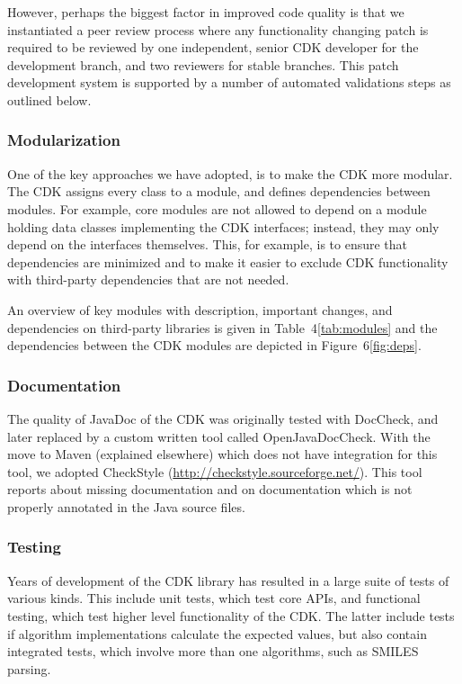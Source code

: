 \documentclass[10pt]{bmcart}
\begin{document}
However, perhaps the biggest factor in improved code quality is that we
instantiated a peer review process where any functionality changing patch is
required to be reviewed by one independent, senior CDK developer for  the development
branch, and two reviewers for stable branches. This patch development system
is supported by a number of automated validations steps as outlined below.

  \subsubsection*{Modularization}
  
One of the key approaches we have adopted, is to make the CDK more modular. The CDK assigns
every class to a module, and defines dependencies between modules. For example, core modules
are not allowed to depend on a module holding data classes implementing the CDK interfaces;
instead, they may only depend on the interfaces themselves. This, for example, is to ensure
that dependencies are minimized and to make it easier to exclude CDK functionality with
third-party dependencies that are not needed.

An overview of key modules with description, important changes, and dependencies
on third-party libraries is given in Table~4\ref{tab:modules} and the dependencies
between the CDK modules are depicted in Figure~6\ref{fig:deps}.

  \subsubsection*{Documentation}

  The quality of JavaDoc of the CDK was originally tested with DocCheck, and
  later replaced by a custom written tool called OpenJavaDocCheck. With the move
  to Maven (explained elsewhere) which does not have integration for this tool,
  we adopted CheckStyle (\url{http://checkstyle.sourceforge.net/}). This tool
  reports about missing documentation and on documentation which is not properly
  annotated in the Java source files.

  \subsubsection*{Testing}

  Years of development of the CDK library has resulted in a large suite of
  tests of various kinds. This include unit tests, which test core APIs, and
  functional testing, which test higher level functionality of the CDK. The
  latter include tests if algorithm implementations calculate the expected
  values, but also contain integrated tests, which involve more than one
  algorithms, such as SMILES parsing.
\end{document}

